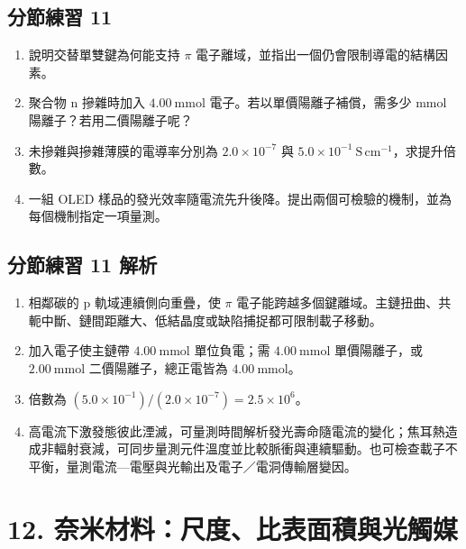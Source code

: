 \documentclass[11pt,a4paper]{article}
\providecommand{\tightlist}{%
  \setlength{\itemsep}{0pt}\setlength{\parskip}{0pt}}
\begin{document}
\subsection{分節練習 11}\label{ux5206ux7bc0ux7df4ux7fd2-11}

\begin{enumerate}
\def\labelenumi{\arabic{enumi}.}
\tightlist
\item
  說明交替單雙鍵為何能支持 \(\pi\) 電子離域，並指出一個仍會限制導電的結構因素。
\item
  聚合物 n 摻雜時加入 \(4.00\ \mathrm{mmol}\) 電子。若以單價陽離子補償，需多少 mmol 陽離子？若用二價陽離子呢？
\item
  未摻雜與摻雜薄膜的電導率分別為 \(2.0\times10^{-7}\) 與 \(5.0\times10^{-1}\ \mathrm{S\,cm^{-1}}\)，求提升倍數。
\item
  一組 OLED 樣品的發光效率隨電流先升後降。提出兩個可檢驗的機制，並為每個機制指定一項量測。
\end{enumerate}

\subsection{分節練習 11 解析}\label{ux5206ux7bc0ux7df4ux7fd2-11-ux89e3ux6790}

\begin{enumerate}
\def\labelenumi{\arabic{enumi}.}
\tightlist
\item
  相鄰碳的 p 軌域連續側向重疊，使 \(\pi\) 電子能跨越多個鍵離域。主鏈扭曲、共軛中斷、鏈間距離大、低結晶度或缺陷捕捉都可限制載子移動。
\item
  加入電子使主鏈帶 \(4.00\ \mathrm{mmol}\) 單位負電；需 \(4.00\ \mathrm{mmol}\) 單價陽離子，或 \(2.00\ \mathrm{mmol}\) 二價陽離子，總正電皆為 \(4.00\ \mathrm{mmol}\)。
\item
  倍數為 \((5.0\times10^{-1})/(2.0\times10^{-7})=2.5\times10^6\)。
\item
  高電流下激發態彼此湮滅，可量測時間解析發光壽命隨電流的變化；焦耳熱造成非輻射衰減，可同步量測元件溫度並比較脈衝與連續驅動。也可檢查載子不平衡，量測電流---電壓與光輸出及電子／電洞傳輸層變因。
\end{enumerate}

\section{12. 奈米材料：尺度、比表面積與光觸媒}\label{ux5948ux7c73ux6750ux6599ux5c3aux5ea6ux6bd4ux8868ux9762ux7a4dux8207ux5149ux89f8ux5a92}
\end{document}
